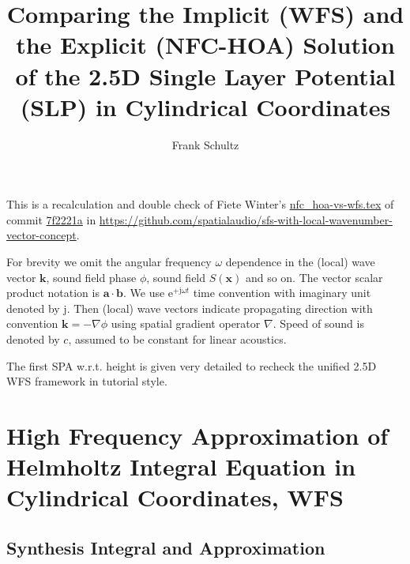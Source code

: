 \documentclass[a4paper,BCOR=15mm,10pt,twoside]{scrartcl}
\title{Comparing the Implicit (WFS) and the Explicit (NFC-HOA) Solution of the 
2.5D Single Layer Potential (SLP) in Cylindrical Coordinates}
\author{Frank Schultz}
\newcommand\e{\mathrm{e}}  %
\newcommand\im{\mathrm{j}}  %
\renewcommand{\vec}[1]{\mathbf{#1}}  %
\begin{document}
\maketitle
%
This is a recalculation and double check of Fiete Winter's \url{nfc_hoa-vs-wfs.tex} of commit \url{7f2221a} in \url{https://github.com/spatialaudio/sfs-with-local-wavenumber-vector-concept}.

For brevity we omit the angular frequency $\omega$ dependence in the (local) wave vector $\vec{k}$, sound field phase $\phi$, sound field $S(\vec{x})$ and so on. The vector scalar product notation is $\vec{a} \cdot \vec{b}$.
%
We use $\e^{+\im \omega t}$ time convention with imaginary unit denoted by $\im$.
%
Then (local) wave vectors indicate propagating direction with convention $\vec{k} = - \nabla \phi$ using spatial gradient operator $\nabla$. Speed of sound is denoted by $c$, assumed to be constant for linear acoustics.

The first SPA w.r.t. height is given very detailed to recheck the unified 2.5D WFS framework in tutorial style.

\section{High Frequency Approximation of Helmholtz Integral Equation in Cylindrical Coordinates, WFS}

\subsection{Synthesis Integral and Approximation}
\end{document}
